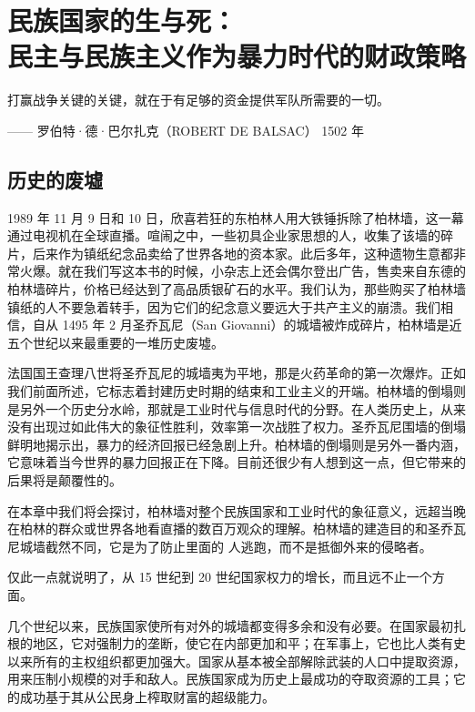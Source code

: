 \chapter[民族国家的生与死]{民族国家的生与死：\\ 民主与民族主义作为暴力时代的财政策略}

\begin{tcolorbox}
\kaishu 打赢战争关键的关键，就在于有足够的资金提供军队所需要的一切。
\begin{flushright}
—— 罗伯特·德·巴尔扎克（ROBERT DE BALSAC） 1502 年
\end{flushright}
\end{tcolorbox}


\section{历史的废墟}

1989 年 11 月 9 日和 10 日，欣喜若狂的东柏林人用大铁锤拆除了柏林墙，这一幕通过电视机在全球直播。喧闹之中，一些初具企业家思想的人，收集了该墙的碎片，后来作为镇纸纪念品卖给了世界各地的资本家。此后多年，这种遗物生意都非常火爆。就在我们写这本书的时候，小杂志上还会偶尔登出广告，售卖来自东德的柏林墙碎片，价格已经达到了高品质银矿石的水平。我们认为，那些购买了柏林墙镇纸的人不要急着转手，因为它们的纪念意义要远大于共产主义的崩溃。我们相信，自从 1495 年 2 月圣乔瓦尼（San Giovanni）的城墙被炸成碎片，柏林墙是近五个世纪以来最重要的一堆历史废墟。

法国国王查理八世将圣乔瓦尼的城墙夷为平地，那是火药革命的第一次爆炸。正如我们前面所述，它标志着封建历史时期的结束和工业主义的开端。柏林墙的倒塌则是另外一个历史分水岭，那就是工业时代与信息时代的分野。在人类历史上，从来没有出现过如此伟大的象征性胜利，效率第一次战胜了权力。圣乔瓦尼围墙的倒塌鲜明地揭示出，暴力的经济回报已经急剧上升。柏林墙的倒塌则是另外一番内涵，它意味着当今世界的暴力回报正在下降。目前还很少有人想到这一点，但它带来的后果将是颠覆性的。

在本章中我们将会探讨，柏林墙对整个民族国家和工业时代的象征意义，远超当晚在柏林的群众或世界各地看直播的数百万观众的理解。柏林墙的建造目的和圣乔瓦尼城墙截然不同，它是为了防止里面的 人逃跑，而不是抵御外来的侵略者。

仅此一点就说明了，从 15 世纪到 20 世纪国家权力的增长，而且远不止一个方面。

几个世纪以来，民族国家使所有对外的城墙都变得多余和没有必要。在国家最初扎根的地区，它对强制力的垄断，使它在内部更加和平；在军事上，它也比人类有史以来所有的主权组织都更加强大。国家从基本被全部解除武装的人口中提取资源，用来压制小规模的对手和敌人。民族国家成为历史上最成功的夺取资源的工具；它的成功基于其从公民身上榨取财富的超级能力。


